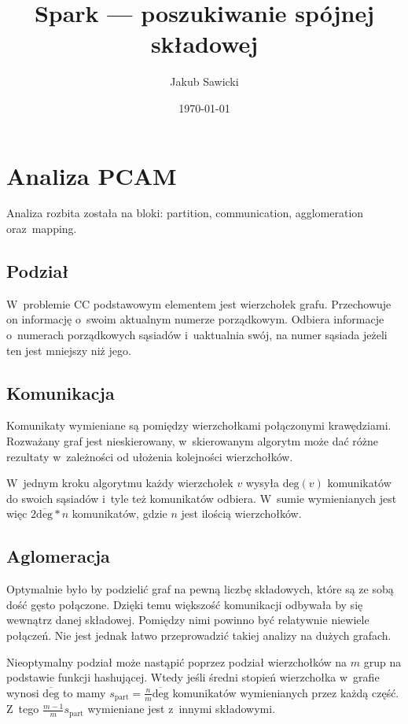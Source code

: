 \documentclass[a4paper; 12pt]{article}
\title{Spark --- poszukiwanie spójnej składowej}
\author{Jakub Sawicki}
\date{\today}
\begin{document}
\renewcommand{\figurename}{Rys.}
\renewcommand{\tablename}{Tab.}
\renewcommand{\abstractname}{Abstrakt}

\maketitle

\section{Analiza PCAM}

Analiza rozbita została na bloki: partition, communication, agglomeration oraz~mapping.~\cite{foster}

\subsection{Podział}
W~problemie CC podstawowym elementem jest wierzchołek grafu.
Przechowuje on informację o~swoim aktualnym numerze porządkowym.
Odbiera informacje o~numerach porządkowych sąsiadów i~uaktualnia swój, na numer
sąsiada jeżeli ten jest mniejszy niż jego.

\subsection{Komunikacja}
Komunikaty wymieniane są pomiędzy wierzchołkami połączonymi krawędziami.
Rozważany graf jest nieskierowany, w~skierowanym algorytm może dać różne
rezultaty w~zależności od ułożenia kolejności wierzchołków.

W~jednym kroku algorytmu każdy wierzchołek $v$ wysyła $\text{deg}(v)$ komunikatów
do swoich sąsiadów i~tyle też komunikatów odbiera.
W~sumie wymienianych jest więc $2\overline{\text{deg}} * n$ komunikatów,
gdzie $n$ jest ilością wierzchołków.

\subsection{Aglomeracja}
Optymalnie było by podzielić graf na pewną liczbę składowych, które są ze sobą
dość gęsto połączone.
Dzięki temu większość komunikacji odbywała by się wewnątrz danej składowej.
Pomiędzy nimi powinno być relatywnie niewiele połączeń.
Nie jest jednak łatwo przeprowadzić takiej analizy na dużych grafach.

Nieoptymalny podział może nastąpić poprzez podział wierzchołków na $m$ grup na
podstawie funkcji hashującej.
Wtedy jeśli średni stopień wierzchołka w~grafie wynosi $\overline{\text{deg}}$
to mamy $s_{\text{part}} = \frac{n}{m} \overline{\text{deg}}$ komunikatów
wymienianych przez każdą część.
Z~tego $\frac{m-1}{m} s_{\text{part}}$ wymieniane jest z~innymi składowymi.
\end{document}
